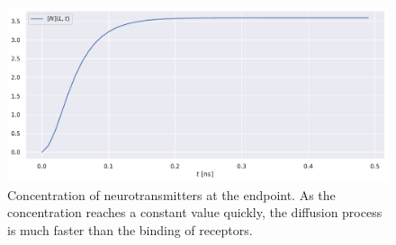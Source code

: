 \documentclass{article}
\begin{document}
\begin{figure}[tb]
        \centering
        \includegraphics[width=0.5\linewidth]{./code/figures/neurotransmitters.pdf}
        \caption{Concentration of neurotransmitters at the endpoint.
        As the concentration reaches a constant value quickly, the diffusion process is much faster than the binding of receptors.}
        \label{fig:neurotrans}
\end{figure}



\end{document}
